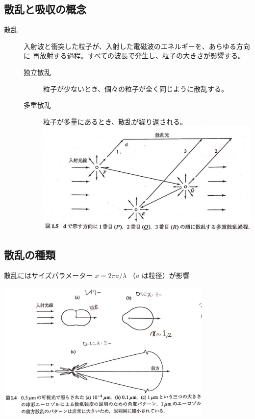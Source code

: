 \documentclass[article,nontitlepage,]{dennou777}
\newcommand{\centeralign}[1]{\rule{0pt}{0pt}\hfill#1\hfill\rule{0pt}{0pt}}
\begin{document}
\subsection{散乱と吸収の概念}
\begin{description}
	\item[散乱] 入射波と衝突した粒子が、入射した電磁波のエネルギーを、あらゆる方向に
		再放射する過程。すべての波長で発生し、粒子の大きさが影響する。
		\begin{description}
			\item[独立散乱] 粒子が少ないとき、個々の粒子が全く同じように散乱する。
			\item[多重散乱] 粒子が多量にあるとき、散乱が繰り返される。\\
				\includegraphics[width=\linewidth]{mscatter.jpg}
		\end{description}
\end{description}

\subsection{散乱の種類}
散乱にはサイズパラメーター $x=2\pi a/\lambda$ （$a$ は粒径）が影響

\centeralign{\includegraphics[width=0.8\textwidth]{scatter.jpg}}
\end{document}
